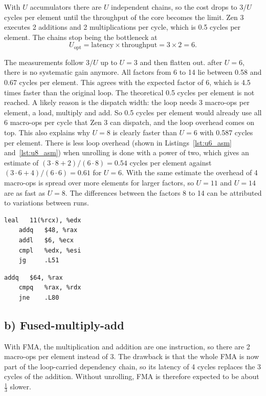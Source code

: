 \documentclass[a4paper,11pt]{article}
\begin{document}
With $U$ accumulators there are $U$ independent chains, so the cost drops to
$3 / U$ cycles per element until the throughput of the core becomes the
limit. Zen 3 executes 2 additions and 2 multiplications per cycle, which is
0.5 cycles per element. The chains stop being the bottleneck at
\[
    U_\text{opt} = \text{latency} \times \text{throughput} = 3 \times 2 = 6 .
\]

The measurements follow $3 / U$ up to $U = 3$ and then flatten out.
after $U = 6$, there is no systematic gain anymore.
All factors from 6 to 14 lie between 0.58 and 0.67 cycles per element.
This agrees with the expected factor of 6, which is 4.5 times faster than the original loop.
The theoretical 0.5 cycles per element is not reached.
A likely reason is the dispatch width: the loop needs 3 macro-ops per element, a load, multiply and add.
So 0.5 cycles per element would already use all 6 macro-ops per cycle that Zen 3 can dispatch, and the loop overhead comes on top.
This also explains why $U = 8$ is clearly faster than $U = 6$ with 0.587 cycles per element.
There is less loop overhead (shown in Listings~\ref{lst:u6_asm} and~\ref{lst:u8_asm}) when unrolling is done with a power of two, which gives an estimate of $(3 \cdot 8 + 2) / (6 \cdot 8) = 0.54$ cycles per element against $(3 \cdot 6 + 4) / (6 \cdot 6) = 0.61$ for $U = 6$.
With the same estimate the overhead of 4 macro-ops is spread over more elements for
larger factors, so $U = 11$ and $U = 14$ are as fast as $U = 8$.
The differences between the factors 8 to 14 can be attributed to variations between runs.

\begin{lstlisting}[caption={Loop overhead of compiled assembler with u=6}, label=lst:u6_asm]
    leal   11(%rcx), %edx     
    addq   $48, %rax          
    addl   $6, %ecx           
    cmpl   %edx, %esi         
    jg     .L51                
\end{lstlisting}

\begin{lstlisting}[caption={Loop overhead of compiled assembler with u=8}, label=lst:u8_asm]
    addq   $64, %rax          
    cmpq   %rax, %rdx         
    jne    .L80                 
\end{lstlisting}

\subsection{b) Fused-multiply-add}

With FMA, the multiplication and addition are one instruction, so there are
2 macro-ops per element instead of 3. The drawback is that the whole FMA is
now part of the loop-carried dependency chain, so its latency of 4 cycles
replaces the 3 cycles of the addition.
Without unrolling, FMA is therefore expected to be about $\frac{1}{3}$ slower.
\end{document}
